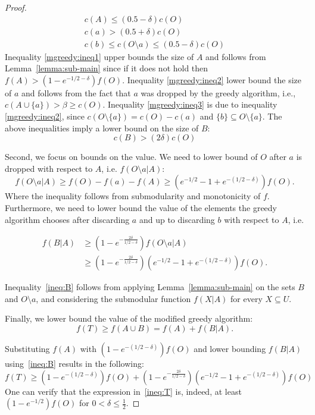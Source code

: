 \begin{proof}
	\begin{align}
		\label{mgreedy:ineq1}
		c(A) \leq (0.5 - \delta)c(O)
		\\
		\label{mgreedy:ineq2}
		c(a) > (0.5 + \delta)c(O)
		\\
		\label{mgreedy:ineq3}
		c(b) \leq c(O \setminus a) \leq (0.5 - \delta)c(O)
	\end{align}
	Inequality \ref{mgreedy:ineq1} upper bounds the size of $A$ and follows from  Lemma~\ref{lemma:sub-main} since if it does not hold then $f(A) > (1 - e^{-1/2 - \delta})f(O)$.
	Inequality \ref{mgreedy:ineq2} lower bound the size of $a$ and follows from the fact that $a$ was dropped by the greedy algorithm, i.e., $c(A \cup \{a\}) > \beta \geq c(O)$. Inequality \ref{mgreedy:ineq3} is due to inequality \ref{mgreedy:ineq2}, since $c(O \setminus \{a\}) = c(O) - c(a)$ and $\{b\} \subseteq O \setminus \{a\}$.
	The above inequalities imply a lower bound  on the size of $B$:
	\begin{equation}
		\label{mgreedy:ineq4}
		c(B) > (2\delta)c(O)
	\end{equation}

	Second, we focus on bounds on the value.
	We need to lower bound of $O$ after $a$ is dropped with respect to $A$, i.e. $f(O \setminus a | A)$:
	\begin{equation}
		f(O \setminus a | A) \geq f(O) - f(a) - f(A) \geq (e^{-1/2} - 1 + e^{-(1/2 - \delta)})f(O).
	\end{equation}
	Where the inequality follows from submodularity and monotonicity of $f$.
	Furthermore, we need to lower bound the value of the elements the greedy algorithm chooses after discarding $a$ and up to discarding $b$ with respect to $A$, i.e. 
	
	\begin{align}
		\label{ineq:B}
		f(B|A)	& \geq (1 - e^{-\frac{2\delta}{1/2 - \delta}})f(O \setminus a | A)
		\\ 		& \geq (1 - e^{-\frac{2\delta}{1/2 - \delta}})(e^{-1/2} - 1 + e^{-(1/2 - \delta)})f(O).
		\nonumber
	\end{align}
	
	Inequality~\ref{ineq:B} follows from applying Lemma~\ref{lemma:sub-main} on the sets $B$ and $O \setminus a$, and considering the submodular function $f(X|A)$ for every $X \subseteq U$.
	
	Finally, we lower bound the value of the modified greedy algorithm:
	\begin{equation}
		f(T) \geq f(A \cup B) = f(A) + f(B | A).
	\end{equation}
	
	Substituting $f(A)$ with $(1 - e^{-(1/2 - \delta)})f(O)$ and lower bounding $f(B|A)$ using~\ref{ineq:B} results in the following:
	\begin{equation}
		\label{ineq:T}
		f(T) \geq (1 - e^{-(1/2 - \delta)})f(O) + (1 - e^{-\frac{2\delta}{1/2 - \delta}})(e^{-1/2} - 1 + e^{-(1/2 - \delta)})f(O)
	\end{equation}
	One can verify that the expression in~\ref{ineq:T} is, indeed, at least $(1-e^{-1/2})f(O)$ for $0 < \delta \leq \frac{1}{2}$.
\end{proof}

